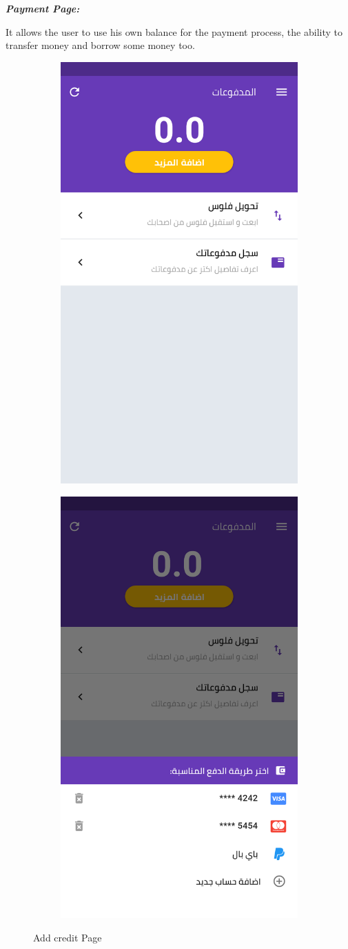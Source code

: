  \par\textbf{\textit{Payment Page:}} \par
 It allows the user to use his own balance for the payment process, the ability to transfer money and borrow some money too.
 \begin{figure}[H] 
 \begin{subfigure}[b]{0.5\linewidth}
    \centering
    \includegraphics[width=0.5\linewidth]{images/ch3/payment/Adding Credit/0.png}
  
  \end{subfigure}%
    \begin{subfigure}[b]{0.5\linewidth}
    \centering
    \includegraphics[width=0.5\linewidth]{images/ch3/payment/Adding Credit/1.png}
  
  \end{subfigure}%

    \caption{ Add credit Page}

  \end{figure}
  
